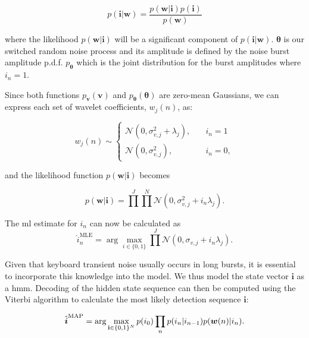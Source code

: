 \begin{equation}\label{eq:Bayes}
p(\boldsymbol{i}|\boldsymbol{w}) = \frac{p(\boldsymbol{w}|\boldsymbol{i})p(\boldsymbol{i})}{p(\boldsymbol{w})}
\end{equation}

where the likelihood $p(\boldsymbol{w}|\boldsymbol{i})$ will be a significant component of $p(\boldsymbol{i}|\boldsymbol{w})$.
$\boldsymbol{\theta}$ is our switched random noise process and its amplitude is defined by the noise burst amplitude p.d.f. $p_{\boldsymbol{\theta}}$ which is the joint distribution for the burst amplitudes where $i_{n} = 1$.

Since both functions $p_{\boldsymbol{v}}(\boldsymbol{v})$ and $p_{\boldsymbol{\theta}}(\boldsymbol{\theta})$ are zero-mean Gaussians, we can express each set of wavelet coefficients, $w_j(n)$, as:

\begin{equation}\label{eq:cases}
  w_j(n) \sim
  \begin{cases}
    \mathcal{N}(0,\sigma_{v,j}^2 + \lambda_j), & \quad i_n = 1\\
   \mathcal{N}(0,\sigma_{v,j}^2), & \quad i_n = 0,
  \end{cases}
\end{equation}

and the likelihood function $p(\boldsymbol{w}|\boldsymbol{i})$ becomes

\begin{equation}\label{eq:likelihood1}
p(\boldsymbol{w}|\boldsymbol{i}) = \prod^J \prod^N \mathcal{N}(0,\sigma_{v,j}^2 + i_n\lambda_j).
\end{equation}

The \gls{ml} estimate for $i_n$ can now be calculated as
\begin{equation}\label{eq:ml1}
\hat{i}_n^{\textrm{MLE}} = \arg\max_{i\in\{0,1\}} \prod^J \mathcal{N}(0,\sigma_{v,j} + i_n\lambda_j).
\end{equation}

Given that keyboard transient noise usually occurs in long bursts, it is essential to incorporate this knowledge into the model. We thus model the state vector $\boldsymbol{i}$ as a \gls{hmm}. Decoding of the hidden state sequence can then be computed using the Viterbi algorithm \cite{Viterbi1967}\cite{Forney1973} to calculate the most likely detection sequence $\boldsymbol{i}$:

\begin{equation}\label{eq:viterbi}
\hat{\boldsymbol{i}}^{\textrm{MAP}} = \arg\max_{{\bf i}\in\{0,1\}^N} p(i_{0})\prod_n p(i_n | i_{n-1})p(\boldsymbol{w}(n) | i_n).
\end{equation}

